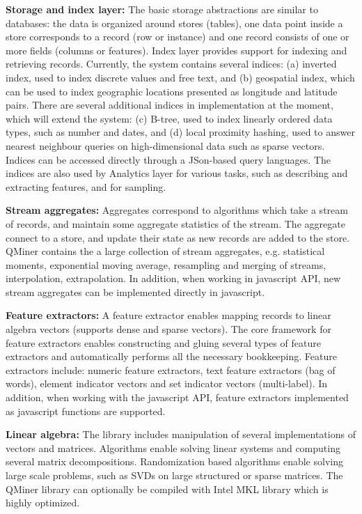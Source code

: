 \documentclass{article} %
\begin{document}
\textbf{Storage and index layer:} The basic storage abstractions are similar to databases: the data is organized around stores (tables), one data point inside a store corresponds to a record (row or instance) and one record consists of one or more fields (columns or features). Index layer provides support for indexing and retrieving records. Currently, the system contains several indices: (a) inverted index, used to index discrete values and free text, and (b) geospatial index, which can be used to index geographic locations presented as longitude and latitude pairs. There are several additional indices in implementation at the moment, which will extend the system: (c) B-tree, used to index linearly ordered data types, such as number and dates, and (d) local proximity hashing, used to answer nearest neighbour queries on high-dimensional data such as sparse vectors. Indices can be accessed directly through a JSon-based query languages. The indices are also used by Analytics layer for various tasks, such as describing and extracting features, and for sampling.

\textbf{Stream aggregates:} Aggregates correspond to algorithms which take a stream of records, and maintain some aggregate statistics of the stream. The aggregate connect to a store, and update their state as new records are added to the store. QMiner contains the a large collection of stream aggregates, e.g. statistical moments, exponential moving average, resampling and merging of streams, interpolation, extrapolation. In addition, when working in javascript API, new stream aggregates can be implemented directly in javascript.

\textbf{Feature extractors:} A feature extractor enables mapping records to linear algebra vectors (supports dense and sparse vectors). The core framework for feature extractors enables constructing and gluing several types of feature extractors and automatically performs all the necessary bookkeeping. Feature extractors include: numeric feature extractors, text feature extractors (bag of words), element indicator vectors and set indicator vectors (multi-label). In addition, when working with the javascript API, feature extractors implemented as javascript functions are supported.

\textbf{Linear algebra:} The library includes manipulation of several implementations of vectors and matrices. Algorithms enable solving linear systems and computing several matrix decompositions. Randomization based algorithms enable solving large scale problems, such as SVDs on large structured or sparse matrices. The QMiner library can optionally be compiled with Intel MKL library which is highly optimized.
\end{document}
